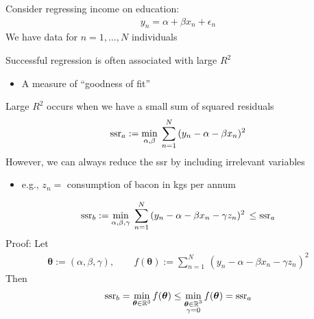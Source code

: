 \documentclass[letterpaper,10pt,english]{jupyterBook}
\begin{document}
\sphinxAtStartPar
Consider regressing income on education:
\begin{equation*}
\begin{split}
%
y_n = \alpha + \beta x_n + \epsilon_n 
%
\end{split}
\end{equation*}
\sphinxAtStartPar
We have data for \(n = 1, \ldots, N\) individuals

\sphinxAtStartPar
Successful regression is often associated with large \(R^2\)
\begin{itemize}
\item {} 
\sphinxAtStartPar
A measure of “goodness of fit”

\end{itemize}

\sphinxAtStartPar
Large \(R^2\) occurs when we have a small sum of squared residuals
\begin{equation*}
\begin{split}
%
{\rm ssr}_a := 
\min_{\alpha, \beta} 
\; \sum_{n=1}^N \, (y_n - \alpha - \beta x_n)^2
%
\end{split}
\end{equation*}
\sphinxAtStartPar
However, we can always reduce the ssr by including irrelevant variables
\begin{itemize}
\item {} 
\sphinxAtStartPar
e.g., \(z_n = \) consumption of bacon in kgs per annum

\end{itemize}
\begin{equation*}
\begin{split}
%
{\rm ssr}_b := 
\min_{\alpha, \beta, \gamma} 
\; \sum_{n=1}^N \, (y_n - \alpha - \beta x_n - \gamma z_n)^2
\, \leq {\rm ssr}_a
%
\end{split}
\end{equation*}
\sphinxAtStartPar
Proof: Let
\begin{equation*}
\begin{split}
%
{\boldsymbol \theta} 
:= (\alpha, \beta, \gamma),
\qquad
f({\boldsymbol \theta}) 
:= 
\sum_{n=1}^N \, (y_n - \alpha - \beta x_n - \gamma z_n)^2
%
\end{split}
\end{equation*}
\sphinxAtStartPar
Then
\begin{equation*}
\begin{split}
%
{\rm ssr}_b 
= \min_{{\boldsymbol \theta} \in \mathbb{R}^3} f({\boldsymbol \theta})
\leq 
\min_{\substack{{\boldsymbol \theta} \in \mathbb{R}^3 \\ \gamma = 0}} f({\boldsymbol \theta})
= {\rm ssr}_a
%
\end{split}
\end{equation*}
\end{document}
